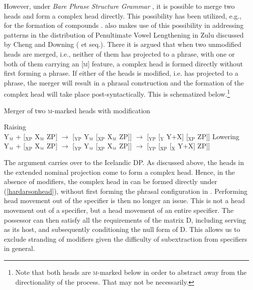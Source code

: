 \documentclass[output=paper]{langscibook}
\begin{document}
However, under \textit{Bare Phrase Structure Grammar} \citep{Chomsky:1995uq}, it is possible to merge two heads and form a complex head directly. This possibility has been utilized, e.g., for the formation of compounds \citep[e.g.,][]{Josefsson:1997te,josefsson1998,zhang2007,Siddiqi:2009tm,okubo2013,Hardarson:2018vo}. \citet{hardarson2020} also makes use of this possibility in addressing patterns in the distribution of Penultimate Vowel Lengthening in Zulu discussed by Cheng and Downing (\citeyear{Cheng:2007um} et seq.). There it is argued that when two unmodified heads are merged, i.e., neither of them has projected to a phrase, with one or both of them carrying an [\textsc{m}] feature, a complex head is formed directly without first forming a phrase. If either of the heads is modified, i.e. has projected to a phrase, the merger will result in a phrasal construction and the formation of the complex head will take place post-syntactically. This is schematized below.\footnote{Note that both heads are \textsc{m}-marked below in order to abstract away from the directionality of the process. That may not be necessarily.}

\begin{exe}
	 \citep[468]{hardarson2020} \label{hardarsonhead}
			\begin{xlist}
			\end{xlist}
	\ex	Merger of two \textsc{m}-marked heads with modification \citep[468]{hardarson2020} \label{hardarsonhead+}
		\begin{xlist}
			\ex	Raising\\
				Y$_{\textsc{m}}$ + [$_{\mathrm{XP}}$ X$_{\textsc{m}}$ ZP] $\rightarrow$ [$_{\mathrm{YP}}$ Y$_{\textsc{m}}$ [$_{\mathrm{XP}}$ X$_{\textsc{m}}$ ZP]] $\rightarrow$ [$_{\mathrm{YP}}$ [$_{\mathrm{Y}}$ Y+X] [$_{\mathrm{XP}}$  ZP]]
			\ex Lowering\\
				Y$_{\textsc{m}}$ + [$_{\mathrm{XP}}$ X$_{\textsc{m}}$ ZP] $\rightarrow$ [$_{\mathrm{YP}}$ Y$_{\textsc{m}}$ [$_{\mathrm{XP}}$ X$_{\textsc{m}}$ ZP]] $\rightarrow$ [$_{\mathrm{YP}}$  [$_{\mathrm{XP}}$ [$_{\mathrm{X}}$ Y+X]  ZP]]
		\end{xlist}
\end{exe} 


\noindent The argument carries over to the Icelandic DP. As discussed above, the heads in the extended nominal projection come to form a complex head. Hence, in the absence of modifiers, the complex head in  can be formed directly under (\ref{hardarsonhead}), without first forming the phrasal configuration in . Performing head movement out of the specifier is then no longer an issue. This is not a head movement out of a specifier, but a head movement of an entire specifier. The possessor can then satisfy all the requirements of the matrix D, including serving as its host, and subsequently conditioning the null form of D. This allows us to exclude stranding of modifiers given the difficulty of subextraction from specifiers in general.
\end{document}
